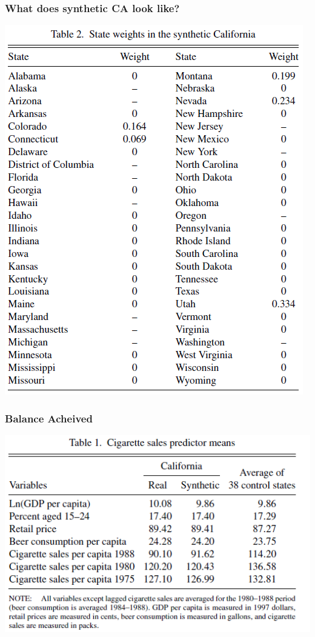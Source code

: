 \begin{frame}
  \frametitle{What does synthetic CA look like?}
  \vspace{-15pt}
  \begin{center}
    \includegraphics[height=.95\textheight]{./resources/ADHWeights}
  \end{center}  
\end{frame}

\begin{frame}
  \frametitle{Balance Acheived}
  \begin{center}
    \includegraphics[width=.9\textwidth]{./resources/ADHSumStats}
  \end{center}  
\end{frame}

